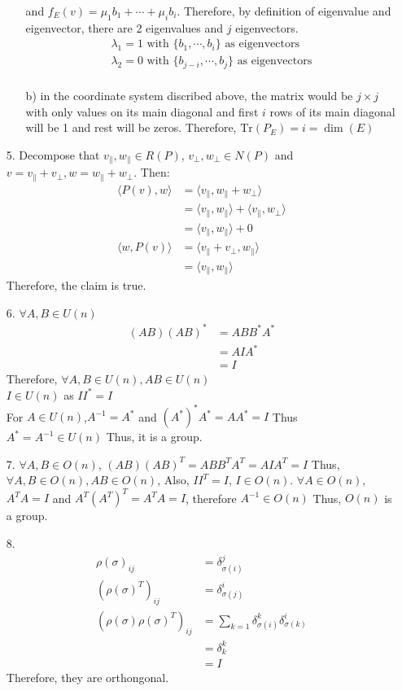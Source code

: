 \documentclass{article}
\begin{document}
\begin{itemize}
\begin{itemize}
         and \(f_E(v)= \mu_1b_1+\cdots+\mu_ib_i\). Therefore, by definition of eigenvalue and eigenvector, there are 2 eigenvalues and \(j\) eigenvectors.
        \begin{align*}
            \lambda_1 = 1 \text{ with } \{b_1,\cdots,b_i\} \text{ as eigenvectors}\\
            \lambda_2 = 0 \text{ with } \{b_{j-i},\cdots,b_j\} \text{ as eigenvectors}\\
        \end{align*}
        \item [b)]
            in the coordinate system discribed above, the matrix would be \(j\times j\) with only values on its main diagonal and first \(i\) rows of its main diagonal will be 1 and rest will be zeros. Therefore, \(\text{Tr}(P_E)=i=\dim(E)\)
    \end{itemize}
    \item [5.] Decompose that \(v_\parallel,w_\parallel \in R(P)\), \(v_{\bot},w_{\bot}\in N(P)\) and \(v = v_\parallel+v_\bot, w = w_\parallel+w_\bot\). Then:
    \begin{align*}
        \langle P(v),w\rangle &= \langle v_\parallel,w_\parallel+w_\bot\rangle\\
        &=\langle v_\parallel,w_\parallel\rangle + \langle v_\parallel,w_\bot\rangle\\
        &=\langle v_\parallel,w_\parallel\rangle + 0\\
        \langle w,P(v)\rangle &= \langle v_\parallel+v_\bot,w_\parallel\rangle\\
        &=\langle v_\parallel,w_\parallel\rangle
    \end{align*}
    Therefore, the claim is true.
    \item [6.]\(\forall A,B\in U(n)\)
    \begin{align*}
        (AB)(AB)^* &= ABB^*A^*\\
        &=AIA^*\\
        &=I
    \end{align*}
    Therefore, \(\forall A,B\in U(n), AB\in U(n)\)\\
    \(I \in U(n)\) as \(II^*=I\)\\
    For \(A \in U(n)\),\(A^{-1}=A^*\) and \((A^*)^*A^* = AA^*=I\) Thus \(A^*=A^{-1}\in U(n)\) Thus, it is a group.
    \item [7.] \(\forall A,B\in O(n)\), \((AB)(AB)^T = ABB^TA^T=AIA^T=I\) Thus, \(\forall A,B\in O(n), AB\in O(n)\), Also, \(II^T=I\), \(I\in O(n)\). \(\forall A\in O(n)\), \(A^TA=I\) and \(A^T(A^T)^T=A^TA=I\), therefore \(A^{-1}\in O(n)\)
    Thus, \(O(n)\) is a group.
    \item [8.]
    \begin{align*}
        \rho(\sigma)_{ij} &= \delta^j_{\sigma(i)} \\
        (\rho(\sigma)^T)_{ij}&=\delta^i_{\sigma(j)}\\
        (\rho(\sigma)\rho(\sigma)^T)_{ij}&=\sum_{k=1}  \delta^k_{\sigma(i)}\delta^i_{\sigma(k)}\\
        &=\delta^k_k\\
        &=I
    \end{align*}
    Therefore, they are orthongonal.
\end{itemize}
\end{document}
